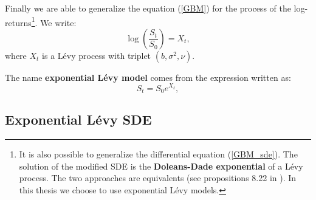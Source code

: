 Finally we are able to generalize the equation (\ref{GBM}) for the process of the log-returns\footnote{
It is also possible to generalize the differential equation (\ref{GBM_sde}). The solution of the modified SDE 
is the \textbf{Doleans-Dade exponential} of a Lévy process. The two approaches are equivalents (see propositions 8.22 in \cite{Cont}).
In this thesis we choose to use exponential Lévy models. }.
We write:
\begin{equation}
 \log \left( \frac{S_t}{S_0} \right) = X_t ,
\end{equation}
where $X_t$ is a Lévy process with triplet $(b,\sigma^2,\nu)$.

The name \textbf{exponential Lévy model} comes from the expression written as: 
\begin{equation}\label{ELM}
 S_t = S_0 e^{X_t} ,
\end{equation}

\subsection{Exponential Lévy SDE}

